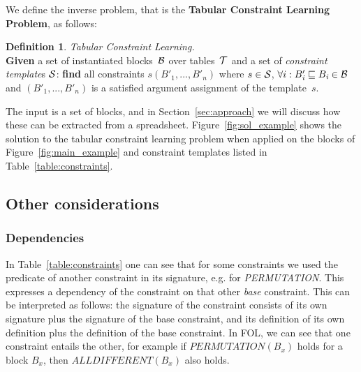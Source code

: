 \documentclass{IEEEtran}
\newcommand{\sergey}[1]{\textcolor{magenta}{{\sc Sergey:} #1}\xspace}
\newcommand{\constraints}{\ensuremath{\mathcal{T}}\xspace}
\newcommand{\format}[1]{\textit{#1}\xspace}
\newcommand{\template}{\format{constraint template}}
\newcommand{\CSignature}{Signature\xspace}
\newcommand{\CFunction}{Definition\xspace}
\newcommand{\groups}{\ensuremath{\mathcal{B}}\xspace}
\newcommand{\ecalldiff}[1]{\ensuremath{\textit{ALLDIFFERENT}(#1)}}
\newcommand{\ecperm}[1]{\ensuremath{\textit{PERMUTATION}(#1)}}
\newcommand{\sbs}{B}
\newcommand{\sbl}[1]{\ensuremath{\sbs_{\textit{#1}}}}
\newcommand{\ssbl}[1]{\ensuremath{\sbs'_{\textit{#1}}}}
\theoremstyle{definition}
\newtheorem{definition}{Definition}
\begin{document}
We define the inverse problem, that is the {\bf Tabular Constraint Learning Problem}, as follows:
%
\begin{definition} \textit{Tabular Constraint Learning.}\label{def:problem_statement}\\
{\bf Given} a set of instantiated blocks~${\cal B}$ over tables~${\cal T}$ and a set of {\template}s ${\cal S}$: {\bf find} all constraints $s(\ssbl{1}, ..., \ssbl{n})$ where $s \in {\cal S}$, $\forall i: \sbl{i}' \sqsubseteq \sbl{i} \in {\cal B}$ and $(\ssbl{1}, ..., \ssbl{n})$ is a satisfied argument assignment of the template~$s$.
\end{definition}


The input is a set of blocks, and in Section~\ref{sec:approach} we will discuss how these can be extracted from a spreadsheet.
Figure~\ref{fig:sol_example} shows the solution to the tabular constraint learning problem when applied on the blocks of Figure~\ref{fig:main_example} and constraint templates listed in Table~\ref{table:constraints}.

\subsection{Other considerations}

\subsubsection{Dependencies}
\label{sec:form:dependencies}
In Table~\ref{table:constraints} one can see that for some constraints we used the predicate of another constraint in its signature, e.g. for \textit{PERMUTATION}.
This expresses a dependency of the constraint on that other \textit{base} constraint.
This can be interpreted as follows: the signature of the constraint consists of its own signature plus the signature of the base constraint, and its definition of its own definition plus the definition of the base constraint.
In FOL, we can see that one constraint entails the other, for example if $\ecperm{\sbl{x}}$ holds for a block $\sbl{x}$, then $\ecalldiff{\sbl{x}}$ also holds.
\end{document}

